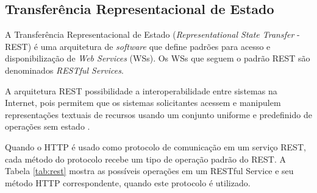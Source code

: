 	
	\subsection{Transferência Representacional de Estado}
	
	A Transferência Representacional de Estado (\textit{Representational State Transfer} - REST) é uma arquitetura de \textit{software} que define padrões para acesso e disponibilização de \textit{Web Services} (WSs). Os WSs que seguem o padrão REST são denominados \textit{RESTful Services}.
	
	A arquitetura REST possibilidade a interoperabilidade entre sistemas na Internet, pois permitem que os sistemas solicitantes acessem e manipulem representações textuais de recursos usando um conjunto uniforme e predefinido de operações sem estado \cite{ferris2004webservices}.
	
	Quando o HTTP é usado como protocolo de comunicação em um serviço REST, cada método do protocolo recebe um tipo de operação padrão do REST. A Tabela \ref{tab:rest} mostra as possíveis operações em um RESTful Service e seu método HTTP correspondente, quando este protocolo é utilizado.
	

	\begin{table}[hbt!]
		\centering
		\caption{Possíveis operações em um \textit{RESTful Service}.}
		\label{tab:rest}
	\end{table}
	

	
	
	